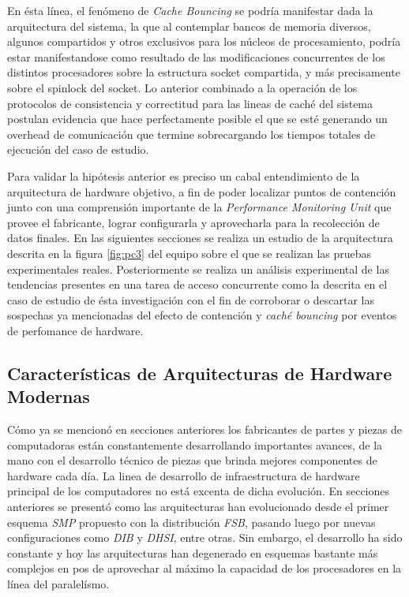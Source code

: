En ésta línea, el fenómeno de \emph{Cache Bouncing} se podría manifestar dada la arquitectura del sistema, la que al contemplar bancos de memoria diversos, algunos compartidos y otros exclusivos para los núcleos de procesamiento, podría estar manifestandose como resultado de las modificaciones concurrentes de los distintos procesadores sobre la estructura socket compartida, y más precisamente sobre el spinlock del socket. Lo anterior combinado a la operación de los protocolos de consistencia y correctitud para las lineas de caché del sistema postulan evidencia que hace perfectamente posible el que se esté generando un overhead de comunicación que termine sobrecargando los tiempos totales de ejecución del caso de estudio.

Para validar la hipótesis anterior es preciso un cabal entendimiento de la arquitectura de hardware objetivo, a fin de poder localizar puntos de contención junto con una comprensión importante de la \emph{Performance Monitoring Unit} que provee el fabricante, lograr configurarla y aprovecharla para la recolección de datos finales. En las siguientes secciones se realiza un estudio de la arquitectura descrita en la figura \ref{fig:pc3} del equipo sobre el que se realizan las pruebas experimentales reales. Posteriormente se realiza un análisis experimental de las tendencias presentes en una tarea de acceso concurrente como la descrita en el caso de estudio de ésta investigación con el fin de corroborar o descartar las sospechas ya mencionadas del efecto de contención y \emph{caché bouncing} por eventos de perfomance de hardware.

\subsection{Características de Arquitecturas de Hardware Modernas}
Cómo ya se mencionó en secciones anteriores los fabricantes de partes y piezas de computadoras están constantemente desarrollando importantes avances, de la mano con el desarrollo técnico de piezas que brinda mejores componentes de hardware cada día. La linea de desarrollo de infraestructura de hardware principal de los computadores no está excenta de dicha evolución. En secciones anteriores se presentó como las arquitecturas han evolucionado desde el primer esquema \emph{SMP} propuesto con la distribución \emph{FSB}, pasando luego por nuevas configuraciones como \emph{DIB} y \emph{DHSI}, entre otras. Sin embargo, el desarrollo ha sido constante y hoy las arquitecturas han degenerado en esquemas bastante más complejos en pos de aprovechar al máximo la capacidad de los procesadores en la línea del paralelísmo.

